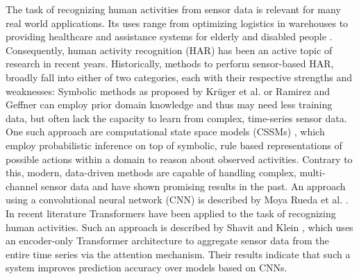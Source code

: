 \documentclass[11pt,titlepage,oneside,openany]{book}
\begin{document}

The task of recognizing human activities from sensor data is relevant for many real world applications. Its uses range from optimizing logistics in warehouses to providing healthcare and assistance systems for elderly and disabled people \cite{ludtke_human_2021, chen_sensor-based_2012}. Consequently, human activity recognition (HAR) has been an active topic of research in recent years. Historically, methods to perform sensor-based HAR, broadly fall into either of two categories, each with their respective strengths and weaknesses: Symbolic methods as proposed by Kr\"uger et al. or Ramirez and Geffner \cite{kruger_computational_2014, ramirez_goal_2011} can employ prior domain knowledge and thus may need less training data, but often lack the capacity to learn from complex, time-series sensor data. One such approach are computational state space models (CSSMs) \cite{kruger_computational_2014}, which employ probabilistic inference on top of symbolic, rule based representations of possible actions within a domain to reason about observed activities. Contrary to this, modern, data-driven methods are capable of handling complex, multi-channel sensor data and have shown promising results in the past. An approach using a convolutional neural network (CNN) is described by Moya Rueda et al. \cite{moya_rueda_convolutional_2018}. In recent literature Transformers have been applied to the task of recognizing human activities. Such an approach is described by Shavit and Klein \cite{shavit_boosting_2021}, which uses an encoder-only Transformer architecture to aggregate sensor data from the entire time series via the attention mechanism. Their results indicate that such a system improves prediction accuracy over models based on CNNs.
\end{document}
